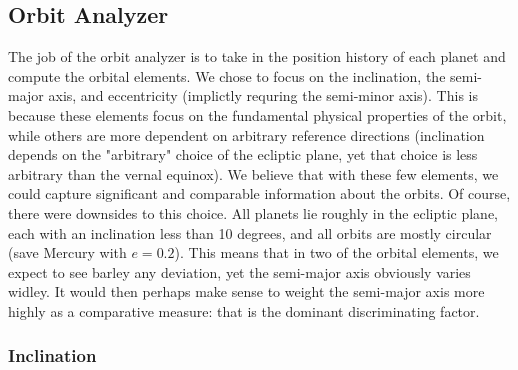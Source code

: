\documentclass[a4paper,12pt]{article} %
\numberwithin{equation}{section} %
\numberwithin{figure}{section} %
\begin{document}
\subsection{Orbit Analyzer}

The job of the orbit analyzer is to take in the position history of each planet and compute the orbital elements. We chose to focus on the inclination, the semi-major axis, and eccentricity (implictly requring the semi-minor axis). This is because these elements focus on the fundamental physical properties of the orbit, while others are more dependent on arbitrary reference directions (inclination depends on the "arbitrary" choice of the ecliptic plane, yet that choice is less arbitrary than the vernal equinox). We believe that with these few elements, we could capture significant and comparable information about the orbits. Of course, there were downsides to this choice. All planets lie roughly in the ecliptic plane, each with an inclination less than 10 degrees, and all orbits are mostly circular (save Mercury with $e=0.2$). This means that in two of the orbital elements, we expect to see barley any deviation, yet the semi-major axis obviously varies widley. It would then perhaps make sense to weight the semi-major axis more highly as a comparative measure: that is the dominant discriminating factor.

\subsubsection{Inclination}
\end{document}
